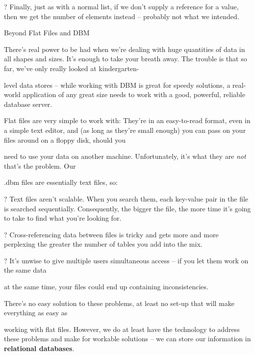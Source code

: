 \documentclass[a4paper,11pt]{book}
\begin{document}
\noindent 

\noindent ? Finally, just as with a normal list, if we don't supply a reference for a value, then we get the number of elements instead -- probably not what we intended.

\noindent 

\noindent 

\noindent Beyond Flat Files and DBM

\noindent 

\noindent There's real power to be had when we're dealing with huge quantities of data in all shapes and sizes. It's enough to take your breath away. The trouble is that so far, we've only really looked at kindergarten-

\noindent level data stores -- while working with DBM is great for speedy solutions, a real-world application of any great size needs to work with a good, powerful, reliable database server.

\noindent 

\noindent Flat files are very simple to work with: They're in an easy-to-read format, even in a simple text editor, and (as long as they're small enough) you can pass on your files around on a floppy disk, should you

\noindent need to use your data on another machine. Unfortunately, it's what they are \textit{not }that's the problem. Our

\noindent .dbm files are essentially text files, so:

\noindent 

\noindent ? Text files aren't scalable. When you search them, each key-value pair in the file is searched sequentially. Consequently, the bigger the file, the more time it's going to take to find what you're looking for.

\noindent ? Cross-referencing data between files is tricky and gets more and more perplexing the greater the number of tables you add into the mix.

\noindent ? It's unwise to give multiple users simultaneous access -- if you let them work on the same data

\noindent at the same time, your files could end up containing inconsistencies.

\noindent 

\noindent 

\noindent There's no easy solution to these problems, at least no set-up that will make everything as easy as

\noindent working with flat files. However, we do at least have the technology to address these problems and make for workable solutions -- we can store our information in \textbf{relational databases}.
\end{document}
